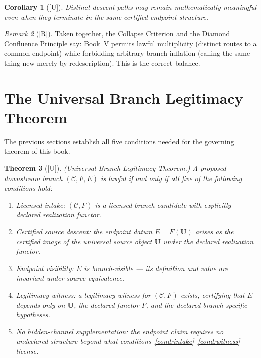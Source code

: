 \documentclass[12pt,oneside]{amsbook}
\theoremstyle{plain}
\newtheorem{theorem}{Theorem}[section]
\newtheorem{corollary}[theorem]{Corollary}
\theoremstyle{definition}
\theoremstyle{remark}
\newtheorem{remark}[theorem]{Remark}
\newcommand{\status}[1]{\textup{[#1]}}
\begin{document}
\begin{corollary}[\status{U}]\label{cor:route-distinct-meaningful}
Distinct descent paths may remain mathematically meaningful even when
they terminate in the same certified endpoint structure.
\end{corollary}

\begin{remark}[\status{R}]\label{rmk:diamond-permits-multiplicity}
Taken together, the Collapse Criterion and the Diamond Confluence
Principle say: Book~V permits lawful multiplicity (distinct routes to
a common endpoint) while forbidding arbitrary branch inflation (calling
the same thing new merely by redescription).  This is the correct
balance.
\end{remark}

\section{The Universal Branch Legitimacy Theorem}

The previous sections establish all five conditions needed for the
governing theorem of this book.

\begin{theorem}[\status{U}]\label{thm:UBLT}
\textup{(Universal Branch Legitimacy Theorem.)}  A proposed downstream
branch $(\mathcal{C}, F, E)$ is lawful if and only if all five of the
following conditions hold:
\begin{enumerate}[label=\textup{(\arabic*)}]
  \item\label{cond:intake} \emph{Licensed intake}: $(\mathcal{C}, F)$
        is a licensed branch candidate with explicitly declared
        realization functor.
  \item\label{cond:descent} \emph{Certified source descent}: the
        endpoint datum $E = F(\mathbf{U})$ arises as the certified
        image of the universal source object $\mathbf{U}$ under the
        declared realization functor.
  \item\label{cond:visibility} \emph{Endpoint visibility}: $E$ is
        branch-visible --- its definition and value are invariant under
        source equivalence.
  \item\label{cond:witness} \emph{Legitimacy witness}: a legitimacy
        witness for $(\mathcal{C}, F)$ exists, certifying that $E$
        depends only on $\mathbf{U}$, the declared functor $F$, and
        the declared branch-specific hypotheses.
  \item\label{cond:no-channel} \emph{No hidden-channel supplementation}:
        the endpoint claim requires no undeclared structure beyond what
        conditions~\ref{cond:intake}--\ref{cond:witness} license.
\end{enumerate}
\end{theorem}
\end{document}
